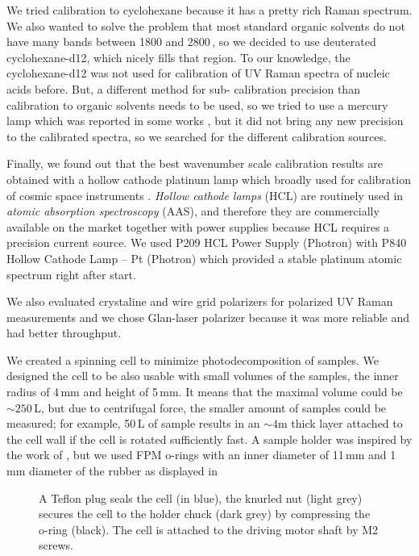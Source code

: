 We tried calibration to cyclohexane because it has a pretty rich Raman
spectrum.
We also wanted to solve the problem that most standard organic solvents do not
have many bands between 1800 and 2800\,\icm{}, so we decided to use deuterated
cyclohexane-d12, which nicely fills that region.
To our knowledge, the cyclohexane-d12 was not used for calibration of UV Raman
spectra of nucleic acids before.
But, a different method for sub-\icm{} calibration precision
than calibration to organic solvents needs to be used,
so we tried to use a mercury lamp which was reported in some works
\textcite{Manoharan1990},
but it did not bring any new precision to
the calibrated spectra, so we searched for the different calibration sources.

Finally, we found out that the best wavenumber scale calibration results are
obtained with a hollow cathode platinum lamp which broadly used for calibration
of cosmic space instruments
\parencite{%
	Mount1977,%
	Reader1990,%
	Sansonetti1992%
}.
\emph{Hollow cathode lamps} (HCL) are routinely used in \emph{atomic absorption
spectroscopy} (AAS), and therefore they are commercially available on the
market together with power supplies because HCL requires a precision current
source.
We used P209 HCL Power Supply (Photron) with P840 Hollow Cathode Lamp -- Pt
(Photron) which provided a stable platinum atomic spectrum right after start.

We also evaluated crystaline and wire grid polarizers for polarized UV Raman
measurements and we chose Glan-laser polarizer because it was more reliable
and had better throughput.

We created a spinning cell to minimize photodecomposition of samples.
We designed the cell to be also usable with small volumes of the samples, the
inner radius of 4\,mm and height of 5\,mm.
It means that the maximal volume could be $\sim250$\,L, but due to
centrifugal force, the smaller amount of samples could be measured;
for example, 50\,L of sample results in an $\sim 4$m thick layer
attached to the cell wall if the cell is rotated sufficiently fast.
A sample holder was inspired by the work of
\textcite{Shriver1974},
but we used FPM o-rings with an inner diameter of 11\,mm and 1\,mm diameter of
the rubber as displayed in

\begin{figure}
	\centering
	
	\caption[%
		Spinning cell holder.%
	]{%
		A Teflon plug seals the cell (in blue), the knurled nut (light grey)
		secures the cell to the holder chuck (dark grey) by compressing the o-ring
		(black).
		The cell is attached to the driving motor shaft by M2 screws.
	}
	\label{\figlabel{spinning_cell:drawing}}
\end{figure}

